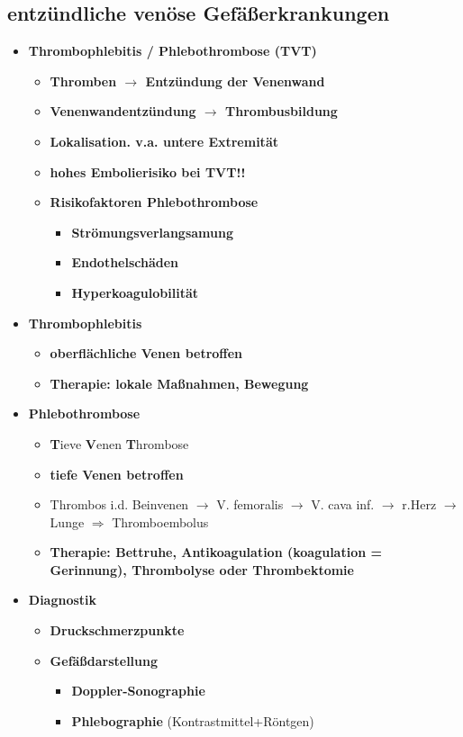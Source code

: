 \subsection{entzündliche venöse Gefäßerkrankungen}
	\begin{itemize}
		\item \textbf{Thrombophlebitis / Phlebothrombose (TVT)}
			\begin{itemize}
				\item \textbf{Thromben $\rightarrow$ Entzündung der Venenwand}
				\item \textbf{Venenwandentzündung $\rightarrow$ Thrombusbildung}
				\item \textbf{Lokalisation. v.a. untere Extremität}
				\item \textbf{hohes Embolierisiko bei TVT!!}
				\item \textbf{Risikofaktoren Phlebothrombose}
					\begin{itemize}
						\item \textbf{Strömungsverlangsamung}
						\item \textbf{Endothelschäden}
						\item \textbf{Hyperkoagulobilität}
					\end{itemize}
			\end{itemize}
		\item \textbf{Thrombophlebitis}
			\begin{itemize}
				\item \textbf{oberflächliche Venen betroffen}
				\item \textbf{Therapie: lokale Maßnahmen, Bewegung}
			\end{itemize}
		\item \textbf{Phlebothrombose}
			\begin{itemize}
				\item \textbf{T}ieve \textbf{V}enen \textbf{T}hrombose
				\item \textbf{tiefe Venen betroffen}
				\item Thrombos i.d. Beinvenen $\rightarrow$ V. femoralis $\rightarrow$ V. cava inf. $\rightarrow$ r.Herz $\rightarrow$ Lunge $\Rightarrow$ Thromboembolus
				\item \textbf{Therapie: Bettruhe, Antikoagulation (koagulation = Gerinnung), Thrombolyse oder Thrombektomie}
			\end{itemize}
		\item \textbf{Diagnostik}
			\begin{itemize}
				\item \textbf{Druckschmerzpunkte}
				\item \textbf{Gefäßdarstellung}
					\begin{itemize}
						\item \textbf{Doppler-Sonographie}
						\item \textbf{Phlebographie} (Kontrastmittel+Röntgen)
					\end{itemize}
			\end{itemize}
	\end{itemize}
